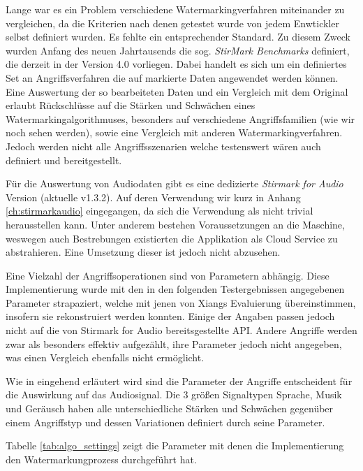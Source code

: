 Lange war es ein Problem verschiedene Watermarkingverfahren miteinander zu vergleichen, da die Kriterien nach denen getestet wurde von jedem Enwtickler selbst definiert wurden. Es fehlte ein entsprechender Standard. Zu diesem Zweck wurden Anfang des neuen Jahrtausends die sog. \textit{StirMark Benchmarks} definiert\cite{petitcolas2000watermarking}\cite{petitcolas2004stirmark}, die derzeit in der Version 4.0 vorliegen. Dabei handelt es sich um ein definiertes Set an Angriffsverfahren die auf markierte Daten angewendet werden können. Eine Auswertung der so bearbeiteten Daten und ein Vergleich mit dem Original erlaubt Rückschlüsse auf die Stärken und Schwächen eines Watermarkingalgorithmuses, besonders auf verschiedene Angriffsfamilien (wie wir noch sehen werden), sowie eine Vergleich mit anderen Watermarkingverfahren. Jedoch werden nicht alle Angriffsszenarien welche testenswert wären auch definiert und bereitgestellt\cite{steinebach2002stirmark}.

Für die Auswertung von Audiodaten gibt es eine dedizierte \textit{Stirmark for Audio} Version\cite{stirmarkforaudio} (aktuelle v1.3.2). Auf deren Verwendung wir kurz in Anhang \ref{ch:stirmarkaudio} eingegangen, da sich die Verwendung als nicht trivial herausstellen kann. Unter anderem bestehen Voraussetzungen an die Maschine, weswegen auch Bestrebungen existierten die Applikation als Cloud Service zu abstrahieren\cite{petitcolas2001public}. Eine Umsetzung dieser ist jedoch nicht abzusehen. 

Eine Vielzahl der Angriffsoperationen sind von Parametern abhängig. Diese Implementierung wurde mit den in den folgenden Testergebnissen angegebenen Parameter strapaziert, welche mit jenen von Xiangs Evaluierung\cite{xiang2007robust} übereinstimmen, insofern sie rekonstruiert werden konnten. Einige der Angaben passen jedoch nicht auf die von Stirmark for Audio bereitsgestellte API. Andere Angriffe werden zwar als besonders effektiv aufgezählt, ihre Parameter jedoch nicht angegeben, was einen Vergleich ebenfalls nicht ermöglicht. 

Wie in \cite{lang2004stirmark} eingehend erläutert wird sind die Parameter der Angriffe entscheident für die Auswirkung auf das Audiosignal. Die 3 größen Signaltypen Sprache, Musik und Geräusch haben alle unterschiedliche Stärken und Schwächen gegenüber einem Angriffstyp und dessen Variationen definiert durch seine Parameter. 

Tabelle \ref{tab:algo_settings} zeigt die Parameter mit denen die Implementierung den Watermarkungprozess durchgeführt hat. 

